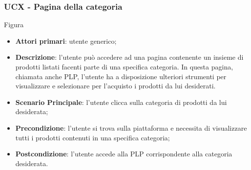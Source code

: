 \subsubsection{UCX - Pagina della categoria}
Figura \\
\begin{itemize}
\item \textbf{Attori primari}: utente generico;
\item \textbf{Descrizione}: l'utente può accedere ad una pagina contenente un insieme di prodotti listati facenti parte di una specifica categoria. In questa pagina, chiamata anche PLP, l'utente ha a disposizione ulteriori strumenti per visualizzare e selezionare per l'acquisto i prodotti da lui desiderati.
\item \textbf{Scenario Principale}: l'utente clicca sulla categoria di prodotti da lui desiderata;
\item \textbf{Precondizione}: l'utente si trova sulla piattaforma e necessita di visualizzare tutti i prodotti contenuti in una specifica categoria;
\item \textbf{Postcondizione}: l'utente accede alla PLP corrispondente alla categoria desiderata.
\end{itemize}